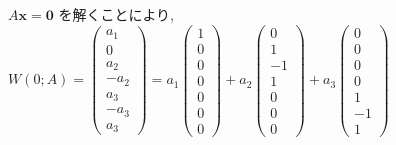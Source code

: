 \documentclass{jsarticle}
\begin{document}
$A\bm{x} = \bm{0}$ を解くことにより, $W(0;A) = \begin{pmatrix} a_1 \\ 0 \\ a_2 \\ -a_2 \\ a_3 \\ -a_3 \\ a_3 \end{pmatrix} = a_1 \begin{pmatrix} 1 \\ 0 \\ 0 \\ 0 \\ 0 \\ 0 \\ 0 \end{pmatrix} + a_2 \begin{pmatrix} 0 \\ 1 \\ -1 \\ 1 \\ 0 \\ 0 \\ 0 \end{pmatrix} + a_3 \begin{pmatrix} 0 \\ 0 \\ 0 \\ 0 \\ 1 \\ -1 \\ 1 \end{pmatrix}$
\end{document}
